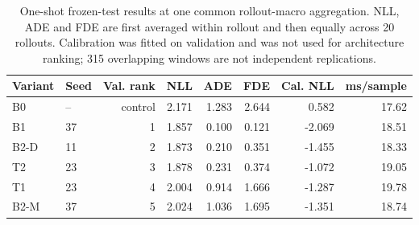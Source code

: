 \begin{table}[h]
\centering\small
\caption{One-shot frozen-test results at one common rollout-macro aggregation. NLL, ADE and FDE are first averaged within rollout and then equally across 20 rollouts. Calibration was fitted on validation and was not used for architecture ranking; 315 overlapping windows are not independent replications.}
\label{tab:app-test}
\begin{tabular}{@{}llrrrrrr@{}}
\toprule
Variant & Seed & Val. rank & NLL & ADE & FDE & Cal. NLL & ms/sample \\
\midrule
B0 & -- & control & 2.171 & 1.283 & 2.644 & 0.582 & 17.62 \\
B1 & 37 & 1 & 1.857 & 0.100 & 0.121 & -2.069 & 18.51 \\
B2-D & 11 & 2 & 1.873 & 0.210 & 0.351 & -1.455 & 18.33 \\
T2 & 23 & 3 & 1.878 & 0.231 & 0.374 & -1.072 & 19.05 \\
T1 & 23 & 4 & 2.004 & 0.914 & 1.666 & -1.287 & 19.78 \\
B2-M & 37 & 5 & 2.024 & 1.036 & 1.695 & -1.351 & 18.74 \\
\bottomrule
\end{tabular}
\end{table}
